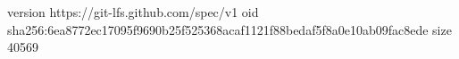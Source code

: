 version https://git-lfs.github.com/spec/v1
oid sha256:6ea8772ec17095f9690b25f525368acaf1121f88bedaf5f8a0e10ab09fac8ede
size 40569
